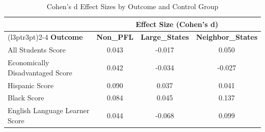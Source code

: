 \begin{table}[!h]
\centering
\caption{\label{tab:tab:cohens_d}Cohen's d Effect Sizes by Outcome and Control Group}
\centering
\begin{tabular}[t]{lccc}
\toprule
\multicolumn{1}{c}{ } & \multicolumn{3}{c}{Effect Size (Cohen's d)} \\
\cmidrule(l{3pt}r{3pt}){2-4}
\textbf{Outcome} & \textbf{Non\_PFL} & \textbf{Large\_States} & \textbf{Neighbor\_States}\\
\midrule
All Students Score & 0.043 & -0.017 & 0.050\\
Economically Disadvantaged Score & 0.042 & -0.034 & -0.027\\
Hispanic Score & 0.090 & 0.037 & 0.041\\
Black Score & 0.084 & 0.045 & 0.137\\
English Language Learner Score & 0.044 & -0.068 & 0.099\\
\bottomrule
\end{tabular}
\end{table}